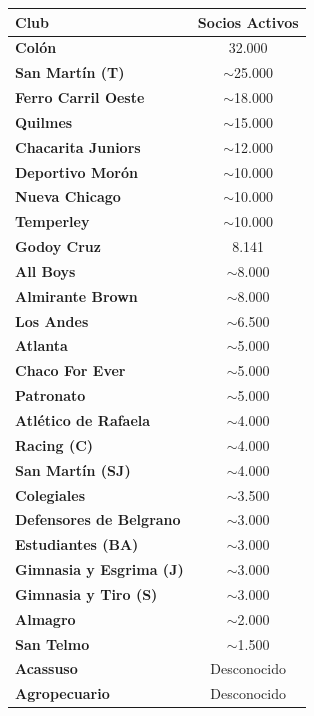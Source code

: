 \begin{table}[h!]
\centering
\renewcommand{\arraystretch}{1.1}
\begin{tabularx}{\textwidth}{|X|c|}
\hline
\rowcolor{gray!20} \textbf{Club} & \textbf{Socios Activos} \\ \hline
\textbf{Colón} & 32.000 \\ \hline
\textbf{San Martín (T)} & $\sim$25.000 \\ \hline
\textbf{Ferro Carril Oeste} & $\sim$18.000 \\ \hline
\textbf{Quilmes} & $\sim$15.000 \\ \hline
\textbf{Chacarita Juniors} & $\sim$12.000 \\ \hline
\textbf{Deportivo Morón} & $\sim$10.000 \\ \hline
\textbf{Nueva Chicago} & $\sim$10.000 \\ \hline
\textbf{Temperley} & $\sim$10.000 \\ \hline
\textbf{Godoy Cruz} & 8.141 \\ \hline
\textbf{All Boys} & $\sim$8.000 \\ \hline
\textbf{Almirante Brown} & $\sim$8.000 \\ \hline
\textbf{Los Andes} & $\sim$6.500 \\ \hline
\textbf{Atlanta} & $\sim$5.000 \\ \hline
\textbf{Chaco For Ever} & $\sim$5.000 \\ \hline
\textbf{Patronato} & $\sim$5.000 \\ \hline
\textbf{Atlético de Rafaela} & $\sim$4.000 \\ \hline
\textbf{Racing (C)} & $\sim$4.000 \\ \hline
\textbf{San Martín (SJ)} & $\sim$4.000 \\ \hline
\textbf{Colegiales} & $\sim$3.500 \\ \hline
\textbf{Defensores de Belgrano} & $\sim$3.000 \\ \hline
\textbf{Estudiantes (BA)} & $\sim$3.000 \\ \hline
\textbf{Gimnasia y Esgrima (J)} & $\sim$3.000 \\ \hline
\textbf{Gimnasia y Tiro (S)} & $\sim$3.000 \\ \hline
\textbf{Almagro} & $\sim$2.000 \\ \hline
\textbf{San Telmo} & $\sim$1.500 \\ \hline
\textbf{Acassuso} & Desconocido \\ \hline
\textbf{Agropecuario} & Desconocido \\ \hline

\end{tabularx}
\end{table}
